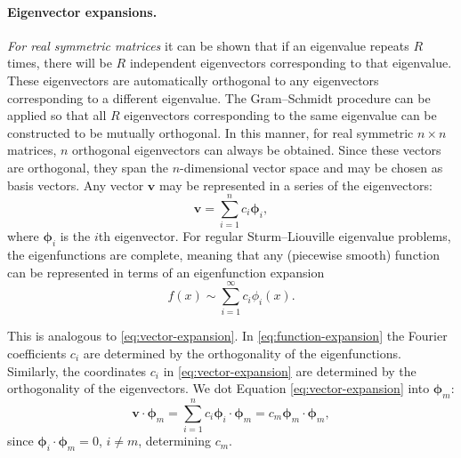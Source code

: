 \paragraph{Eigenvector expansions.}
\textit{For real symmetric matrices} it can be shown that if an eigenvalue repeats $R$ times, there will be $R$ independent eigenvectors corresponding to that eigenvalue.  These eigenvectors are automatically orthogonal to any eigenvectors corresponding to a different eigenvalue.  The Gram--Schmidt procedure can be applied so that all $R$ eigenvectors corresponding to the same eigenvalue can be constructed to be mutually orthogonal.  In this manner, for real symmetric $n \times n$ matrices, $n$ orthogonal eigenvectors can always be obtained.  Since these vectors are orthogonal, they span the $n$-dimensional vector space and may be chosen as basis vectors.  Any vector $\bm{v}$ may be represented in a series of the eigenvectors:
\begin{equation}
\label{eq:vector-expansion}
\bm{v} = \sum_{i=1}^{n} c_i\bm{\phi}_i,
\end{equation}
where $\bm{\phi}_i$ is the $i$th eigenvector.  For regular Sturm--Liouville eigenvalue problems, the eigenfunctions are complete, meaning that any (piecewise smooth) function can be represented in terms of an eigenfunction expansion
\begin{equation}
\label{eq:function-expansion}
f(x) \sim \sum_{i=1}^{\infty} c_i\phi_i(x).
\end{equation}

This is analogous to \eqref{eq:vector-expansion}.  In \eqref{eq:function-expansion} the Fourier coefficients $c_i$ are determined by the orthogonality of the eigenfunctions.  Similarly, the coordinates $c_i$ in \eqref{eq:vector-expansion} are determined by the orthogonality of the eigenvectors.  We dot Equation \eqref{eq:vector-expansion} into $\bm{\phi}_m$:
\[
\bm{v}\cdot\bm{\phi}_m = \sum_{i=1}^{n} c_i\bm{\phi}_i\cdot\bm{\phi}_m = c_m\bm{\phi}_m\cdot\bm{\phi}_m,
\]
since $\bm{\phi}_i\cdot\bm{\phi}_m = 0$, $i \neq m$, determining $c_m$.


